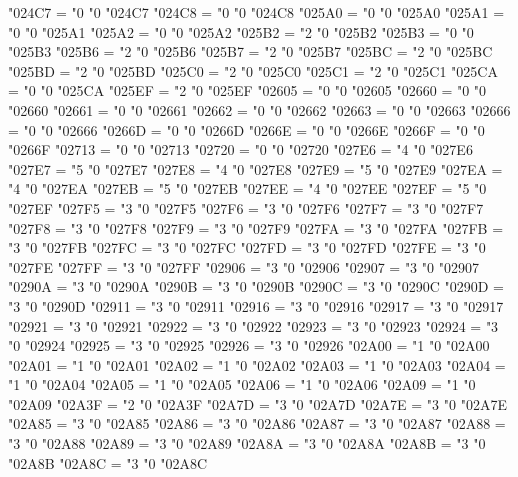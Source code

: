 \Umathcode "024C7 = "0 "0 "024C7
\Umathcode "024C8 = "0 "0 "024C8
\Umathcode "025A0 = "0 "0 "025A0
\Umathcode "025A1 = "0 "0 "025A1
\Umathcode "025A2 = "0 "0 "025A2
\Umathcode "025B2 = "2 "0 "025B2
\Umathcode "025B3 = "0 "0 "025B3
\Umathcode "025B6 = "2 "0 "025B6
\Umathcode "025B7 = "2 "0 "025B7
\Umathcode "025BC = "2 "0 "025BC
\Umathcode "025BD = "2 "0 "025BD
\Umathcode "025C0 = "2 "0 "025C0
\Umathcode "025C1 = "2 "0 "025C1
\Umathcode "025CA = "0 "0 "025CA
\Umathcode "025EF = "2 "0 "025EF
\Umathcode "02605 = "0 "0 "02605
\Umathcode "02660 = "0 "0 "02660
\Umathcode "02661 = "0 "0 "02661
\Umathcode "02662 = "0 "0 "02662
\Umathcode "02663 = "0 "0 "02663
\Umathcode "02666 = "0 "0 "02666
\Umathcode "0266D = "0 "0 "0266D
\Umathcode "0266E = "0 "0 "0266E
\Umathcode "0266F = "0 "0 "0266F
\Umathcode "02713 = "0 "0 "02713
\Umathcode "02720 = "0 "0 "02720
\Umathcode "027E6 = "4 "0 "027E6
\Umathcode "027E7 = "5 "0 "027E7
\Umathcode "027E8 = "4 "0 "027E8
\Umathcode "027E9 = "5 "0 "027E9
\Umathcode "027EA = "4 "0 "027EA
\Umathcode "027EB = "5 "0 "027EB
\Umathcode "027EE = "4 "0 "027EE
\Umathcode "027EF = "5 "0 "027EF
\Umathcode "027F5 = "3 "0 "027F5
\Umathcode "027F6 = "3 "0 "027F6
\Umathcode "027F7 = "3 "0 "027F7
\Umathcode "027F8 = "3 "0 "027F8
\Umathcode "027F9 = "3 "0 "027F9
\Umathcode "027FA = "3 "0 "027FA
\Umathcode "027FB = "3 "0 "027FB
\Umathcode "027FC = "3 "0 "027FC
\Umathcode "027FD = "3 "0 "027FD
\Umathcode "027FE = "3 "0 "027FE
\Umathcode "027FF = "3 "0 "027FF
\Umathcode "02906 = "3 "0 "02906
\Umathcode "02907 = "3 "0 "02907
\Umathcode "0290A = "3 "0 "0290A
\Umathcode "0290B = "3 "0 "0290B
\Umathcode "0290C = "3 "0 "0290C
\Umathcode "0290D = "3 "0 "0290D
\Umathcode "02911 = "3 "0 "02911
\Umathcode "02916 = "3 "0 "02916
\Umathcode "02917 = "3 "0 "02917
\Umathcode "02921 = "3 "0 "02921
\Umathcode "02922 = "3 "0 "02922
\Umathcode "02923 = "3 "0 "02923
\Umathcode "02924 = "3 "0 "02924
\Umathcode "02925 = "3 "0 "02925
\Umathcode "02926 = "3 "0 "02926
\Umathcode "02A00 = "1 "0 "02A00
\Umathcode "02A01 = "1 "0 "02A01
\Umathcode "02A02 = "1 "0 "02A02
\Umathcode "02A03 = "1 "0 "02A03
\Umathcode "02A04 = "1 "0 "02A04
\Umathcode "02A05 = "1 "0 "02A05
\Umathcode "02A06 = "1 "0 "02A06
\Umathcode "02A09 = "1 "0 "02A09
\Umathcode "02A3F = "2 "0 "02A3F
\Umathcode "02A7D = "3 "0 "02A7D
\Umathcode "02A7E = "3 "0 "02A7E
\Umathcode "02A85 = "3 "0 "02A85
\Umathcode "02A86 = "3 "0 "02A86
\Umathcode "02A87 = "3 "0 "02A87
\Umathcode "02A88 = "3 "0 "02A88
\Umathcode "02A89 = "3 "0 "02A89
\Umathcode "02A8A = "3 "0 "02A8A
\Umathcode "02A8B = "3 "0 "02A8B
\Umathcode "02A8C = "3 "0 "02A8C

